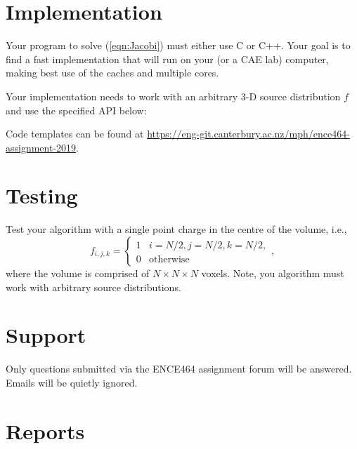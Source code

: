 \documentclass[a4paper,11pt]{article}
\begin{document}
\section{Implementation}

Your program to solve (\ref{eqn:Jacobi}) must either use C or C++.  Your
goal is to find a fast implementation that will run on your (or a CAE
lab) computer, making best use of the caches and multiple cores.

Your implementation needs to work with an arbitrary 3-D source
distribution $f$ and use the specified API below:


\lstset{language=C}
\lstset{basicstyle=\ttfamily\small}
\lstset{breaklines}


Code templates can be found at \url{https://eng-git.canterbury.ac.nz/mph/ence464-assignment-2019}.


\section{Testing}

Test your algorithm with a single point charge in the centre of the
volume, i.e.,
%
\begin{equation}
  f_{i,j,k} = \left\{
  \begin{array}{ll}
    1 & i=N/2, j=N/2, k=N/2, \\
    0 & \mbox{otherwise}
  \end{array}\right.,
\end{equation}
%
where the volume is comprised of $N \times N \times N$ voxels.  Note,
you algorithm must work with arbitrary source distributions.




\section{Support}

Only questions submitted via the ENCE464 assignment forum will be
answered.  Emails will be quietly ignored.


\section{Reports}
\end{document}
